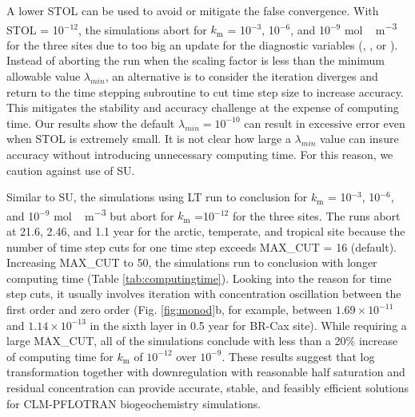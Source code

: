 \documentclass[gmd, manuscript]{copernicus}
\begin{document}
A lower STOL can be used to avoid or mitigate the false convergence. With STOL
= 10$^{-12}$, the simulations abort for $k_\text{m}$ = 10$^{-3}$, 10$^{-6}$,
and 10$^{-9}$ \unit{mol\,m^{-3}} for the three sites due to too big an update
for the diagnostic variables (, , or ).
Instead of aborting the run when the scaling factor is less than the minimum
allowable value $\lambda_{min}$, an alternative is to consider the iteration
diverges and return to the time stepping subroutine to cut time step size to
increase accuracy. This mitigates the stability and accuracy challenge at the
expense of computing time. Our results show the default $\lambda_{min} =
10^{-10}$ can result in excessive error even when STOL is extremely small. It
is not clear how large a $\lambda_{min}$ value can insure accuracy without
introducing unnecessary computing time. For this
reason, we caution against use of SU. 

Similar to SU, the simulations using LT run to conclusion for $k_\text{m}$ =
10$^{-3}$, 10$^{-6}$, and 10$^{-9}$ \unit{mol\,m^{-3}} but abort for
$k_\text{m}$ =10$^{-12}$ for the three sites. The runs abort at 21.6,
2.46, and 1.1 year for the arctic, temperate, and tropical site because the
number of time step cuts for one time step exceeds MAX\_CUT = 16 (default).
Increasing MAX\_CUT to 50, the simulations run to conclusion with longer
computing time (Table \ref{tab:computingtime}). Looking into the reason for
time step cuts, it usually involves iteration with  concentration
oscillation between the first order and zero order (Fig. \ref{fig:monod}b,
for example, between $1.69\times10^{-11}$ and $1.14\times10^{-13}$ in the sixth
layer in 0.5 year for BR-Cax site). While requiring a large
MAX\_CUT, all of the simulations conclude with less than a 20\% increase of
computing time for $k_\text{m}$ of $10^{-12}$ over $10^{-9}$. These results
suggest that log transformation together with downregulation with reasonable
half saturation and residual concentration can provide accurate, stable, and
feasibly efficient solutions for CLM-PFLOTRAN biogeochemistry simulations.  
   
\end{document}
